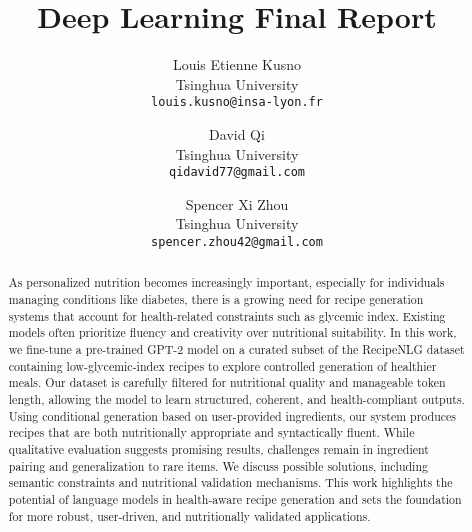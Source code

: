 \title{Deep Learning Final Report}

\author{Louis Etienne Kusno\\
Tsinghua University\\
{\tt\small louis.kusno@insa-lyon.fr}
\and
David Qi\\
Tsinghua University\\
{\tt\small qidavid77@gmail.com}
\and
Spencer Xi Zhou\\
Tsinghua University\\
{\tt\small spencer.zhou42@gmail.com}
}

\maketitle

\begin{abstract}
As personalized nutrition becomes increasingly important, especially for individuals managing conditions like diabetes, there is a growing need for recipe generation systems that account for health-related constraints such as glycemic index. Existing models often prioritize fluency and creativity over nutritional suitability. In this work, we fine-tune a pre-trained GPT-2 model on a curated subset of the RecipeNLG dataset containing low-glycemic-index recipes to explore controlled generation of healthier meals. Our dataset is carefully filtered for nutritional quality and manageable token length, allowing the model to learn structured, coherent, and health-compliant outputs. Using conditional generation based on user-provided ingredients, our system produces recipes that are both nutritionally appropriate and syntactically fluent. While qualitative evaluation suggests promising results, challenges remain in ingredient pairing and generalization to rare items. We discuss possible solutions, including semantic constraints and nutritional validation mechanisms. This work highlights the potential of language models in health-aware recipe generation and sets the foundation for more robust, user-driven, and nutritionally validated applications.
\end{abstract}
